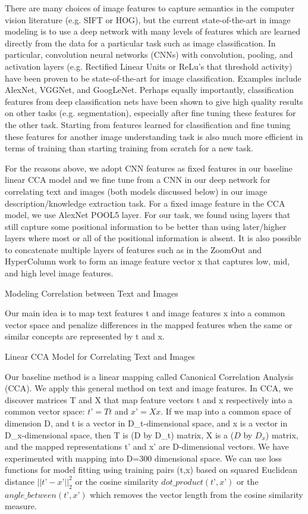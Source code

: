 \documentclass[runningheads]{llncs}
\begin{document}
There are many choices of image features to capture semantics in the computer vision literature (e.g. SIFT or HOG), but the current state-of-the-art in image modeling is to use a deep network with many levels of features which are learned directly from the data for a particular task such as image classification. In particular, convolution neural networks (CNNs) with convolution, pooling, and activation layers (e.g. Rectified Linear Units or ReLu’s that threshold activity) have been proven to be state-of-the-art for image classification. Examples include AlexNet, VGGNet, and GoogLeNet. Perhaps equally importantly, classification features from deep classification nets have been shown to give high quality results on other tasks (e.g. segmentation), especially after fine tuning these features for the other task. Starting from features learned for classification and fine tuning these features for another image understanding task is also much more efficient in terms of training than starting training from scratch for a new task.


For the reasons above, we adopt CNN features as fixed features in our baseline linear CCA model and we fine tune from a CNN in our deep network for correlating text and images (both models discussed below) in our image description/knowledge extraction task. For a fixed image feature in the CCA model, we use AlexNet POOL5 layer. For our task, we found using layers that still capture some positional information to be better than using later/higher layers where most or all of the positional information is absent. It is also possible to concatenate multiple layers of features such as in the ZoomOut and HyperColumn work to form an image feature vector x that captures low, mid, and high level image features.


Modeling Correlation between Text and Images


Our main idea is to map text features t and image features x into a common vector space and penalize differences in the mapped features when the same or similar concepts are represented by t and x.


Linear CCA Model for Correlating Text and Images


Our baseline method is a linear mapping called Canonical Correlation Analysis (CCA). We apply this general method on text and image features. In CCA, we discover matrices T and X that map feature vectors t and x respectively into a common vector space: $t’= Tt$ and $x’=Xx$. If we map into a common space of dimension D, and t is a vector in D\_t-dimensional space, and x is a vector in D\_x-dimensional space, then T is (D by D\_t) matrix, X is a ($D$ by $D_x$) matrix, and the mapped representations t’ and x’ are D-dimensional vectors. We have experimented with mapping into D=300 dimensional space. We can use loss functions for model fitting using training pairs (t,x) based on squared Euclidean distance $||t’-x’||_2^2$ or the cosine similarity $dot\_product(t’,x’)$ or the $angle\_between(t’,x’)$ which removes the vector length from the cosine similarity measure.
\end{document}
